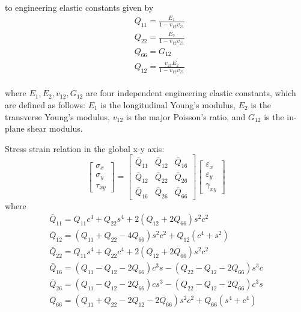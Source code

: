 \documentclass[USenglish,twocolumn]{article}
\begin{document}
to engineering elastic constants given by
\begin{equation}
    \begin{split}
    &Q_{11}=\frac{E_1}{1-v_{12}v_{21}}\\
    &Q_{22}=\frac{E_2}{1-v_{12}v_{21}}\\
    &Q_{66}=G_{12}\\
    &Q_{12}=\frac{v_{21}E_2}{1-v_{12}v_{21}}\\
    \end{split}
\end{equation}

where $E_1, E_2, v_{12}, G_{12} $ are four independent engineering elastic constants, which are defined as follows: $E_1 $ is the longitudinal Young's modulus, $E_2 $ is the transverse Young's modulus, $v_{12} $ is the major Poisson's ratio, and $G_{12} $ is the in-plane shear modulus.

Stress strain relation in the global x-y axis:
\begin{equation}\left[\begin{array}{l}\sigma _{x} \\ \sigma _{y} \\ \tau_{xy}\end{array}\right]=\left[\begin{array}{lll}\bar{Q}_{11} & \bar{Q}_{12} & \bar{Q}_{16}\\ \bar{Q}_{12} & \bar{Q}_{22} & \bar{Q}_{26} \\ \bar{Q}_{16} & \bar{Q}_{26} &\bar{Q}_{66}\end{array}\right]\left[\begin{array}{l}\varepsilon_{x} \\ \varepsilon_{y}\\ \gamma_{x y}\end{array}\right]
\end{equation}
where
\begin{equation}\begin{array}{l}\bar{Q}_{11}=Q_{11} c^{4}+Q_{22} s^{4}+2\left(Q_{12}+2 Q_{66}\right) s^{2} c^{2}\\ \bar{Q}_{12}=\left(Q_{11}+Q_{22}-4 Q_{66}\right) s^{2} c^{2}+Q_{12}\left(c^{4}+s^{2}\right)\\ \bar{Q}_{22}=Q_{11} s^{4}+Q_{22} c^{4}+2\left(Q_{12}+2 Q_{66}\right) s^{2} c^{2} \\\bar{Q}_{16}=\left(Q_{11}-Q_{12}-2 Q_{66}\right) c^{3} s-\left(Q_{22}-Q_{12}-2Q_{66}\right) s^{3} c \\ \bar{Q}_{26}=\left(Q_{11}-Q_{12}-2 Q_{66}\right) c s^{3}-\left(Q_{22}-Q_{12}-2 Q_{66}\right)c^{3} s \\ \bar{Q}_{66}=\left(Q_{11}+Q_{22}-2 Q_{12}-2 Q_{66}\right) s^{2}c^{2}+Q_{66}\left(s^{4}+c^{4}\right)\\\end{array}
\end{equation}
\end{document}
